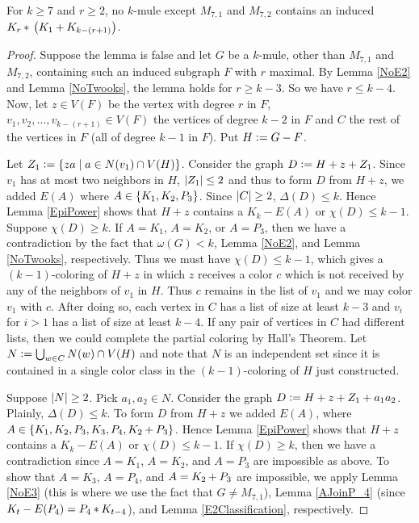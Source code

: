 \begin{lem}\label{NoForksThatArentKnives}
For $k \geq 7$ and $r \geq 2$, no $k$-mule except $M_{7, 1}$ and $M_{7, 2}$
contains an induced $K_r \mbox{\hspace{2 pt}$\ast$\hspace{2 pt}} \left(K_1 \mbox{\hspace{2 pt}$+$\hspace{2 pt}} K_{k - (r + 1)}\right)$.
\end{lem}
\begin{proof}
Suppose the lemma is false and let $G$ be a $k$-mule, other than $M_{7,1}$ and
$M_{7,2}$, containing such an induced subgraph $F$ with $r$ maximal. By Lemma
\ref{NoE2} and Lemma \ref{NoTwooks}, the lemma holds for $r \geq k - 3$. So we have $r \leq k - 4$. Now, let $z \in V(F)$ be the vertex with degree $r$
in $F$, $v_1, v_2, \ldots, v_{k - (r + 1)} \in V(F)$ the vertices of degree $k -
2$ in $F$ and $C$ the rest of the vertices in $F$ (all of degree $k-1$ in $F$). Put $H \mathrel{\mathop:}= G - F$.

Let $Z_1 \mathrel{\mathop:}= \left\{ za \mid a \in N(v_1) \cap V(H) \right\}$.  
Consider the graph $D \mathrel{\mathop:}= H + z + Z_1$.  
Since $v_1$ has at most two neighbors in $H$, $\left|Z_1\right| \leq 2$ and thus to
form $D$ from $H + z$, we added $E(A)$ where $A \in \left\{ K_1, K_2, P_3 \right\}$.  Since
$\left|C\right| \geq 2$, $\Delta(D) \leq k$. Hence Lemma \ref{EpiPower} shows that $H
+ z$ contains a $K_k - E(A)$ or $\chi(D) \leq k - 1$.  
Suppose $\chi(D) \geq k$. 
If $A = K_1$, $A = K_2$, or $A = P_3$, then 
we have a contradiction by the fact that $\omega(G) < k$, Lemma \ref{NoE2}, and
Lemma \ref{NoTwooks}, respectively. Thus
we must have $\chi(D) \leq k - 1$, which gives a $(k - 1)$-coloring of $H + z$
in which $z$ receives a color $c$ which is not received by any of the neighbors
of $v_1$ in $H$. Thus $c$ remains in the list of $v_1$ and we may color $v_1$
with $c$.  After doing so, each vertex in $C$ has a list of size at least $k-3$
and $v_i$ for $i > 1$ has a list of size at least $k-4$.  If any pair of
vertices in $C$ had different lists, then we could complete the partial
coloring by Hall's Theorem.  Let $N \mathrel{\mathop:}= \bigcup_{w \in C} N(w) \cap
V(H)$ and note that $N$ is an independent set since it is contained in a single
color class in the $(k - 1)$-coloring of $H$ just constructed.

Suppose $\left|N\right| \geq 2$.  Pick $a_1, a_2 \in N$. 
Consider the graph $D \mathrel{\mathop:}= H + z + Z_1 + a_1a_2$.  
Plainly, $\Delta(D) \leq k$. 
To form $D$ from $H + z$ we added $E(A)$, where $A \in \left\{ K_1, K_2, P_3, K_3,
P_4, K_2 \mbox{\hspace{2 pt}$+$\hspace{2 pt}} P_3 \right\}$.  Hence Lemma \ref{EpiPower} shows that $H + z$
contains a $K_k - E(A)$ or $\chi(D) \leq k - 1$.  If $\chi(D) \geq k$, then we
have a contradiction since $A = K_1$, $A = K_2$, and $A = P_3$ are impossible
as above.
%
To show that $A=K_3$, $A=P_4$, and $A=K_2 \mbox{\hspace{2 pt}$+$\hspace{2 pt}} P_3$ are impossible,
we apply Lemma \ref{NoE3} (this is where we use the fact that
$G\ne M_{7,1}$), Lemma \ref{AJoinP_4} (since $K_t-E(P_4)=P_4 \mbox{\hspace{2 pt}$\ast$\hspace{2 pt}} K_{t-4}$),
and Lemma \ref{E2Classification}, respectively.


\end{proof}
